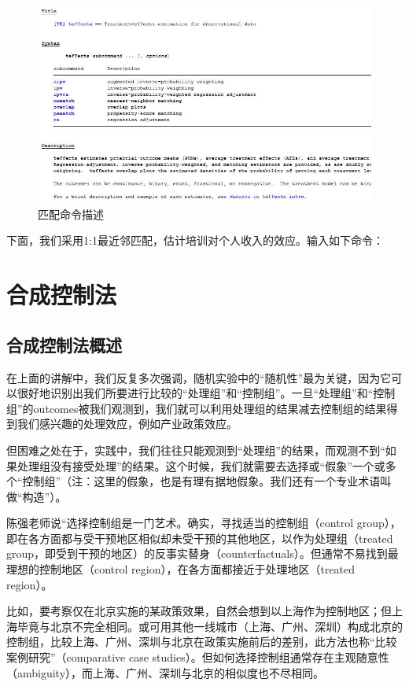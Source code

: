 \documentclass[cn,12pt,math=newtx,citestyle=gb7714-2015,bibstyle=gb7714-2015]{elegantbook}
\begin{document}
	\begin{figure}[htbp]
		\centering
		\includegraphics[width=1\textwidth]{teffects.jpg}
		\caption{匹配命令描述}\label{fig:digit}
	\end{figure}
	
	下面，我们采用1:1最近邻匹配，估计培训对个人收入的效应。输入如下命令：
	
	
	
	
	\section{合成控制法}
	\subsection{合成控制法概述}
	在上面的讲解中，我们反复多次强调，随机实验中的“随机性”最为关键，因为它可以很好地识别出我们所要进行比较的“处理组”和“控制组”。一旦“处理组”和“控制组”的outcomes被我们观测到，我们就可以利用处理组的结果减去控制组的结果得到我们感兴趣的处理效应，例如产业政策效应。
	
	但困难之处在于，实践中，我们往往只能观测到“处理组”的结果，而观测不到“如果处理组没有接受处理”的结果。这个时候，我们就需要去选择或“假象”一个或多个“控制组”（注：这里的假象，也是有理有据地假象。我们还有一个专业术语叫做“构造”）。
	
	陈强老师说“选择控制组是一门艺术。确实，寻找适当的控制组（control group），即在各方面都与受干预地区相似却未受干预的其他地区，以作为处理组（treated group，即受到干预的地区）的反事实替身（counterfactuals）。但通常不易找到最理想的控制地区（control region），在各方面都接近于处理地区（treated region）。
	
	比如，要考察仅在北京实施的某政策效果，自然会想到以上海作为控制地区；但上海毕竟与北京不完全相同。或可用其他一线城市（上海、广州、深圳）构成北京的控制组，比较上海、广州、深圳与北京在政策实施前后的差别，此方法也称“比较案例研究”（comparative case studies）。但如何选择控制组通常存在主观随意性（ambiguity），而上海、广州、深圳与北京的相似度也不尽相同。
	
\end{document}
